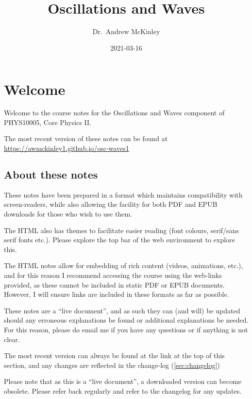 \documentclass[
]{book}
\title{Oscillations and Waves}
\author{Dr.~Andrew McKinley}
\date{2021-03-16}
\begin{document}
\maketitle

{
\setcounter{tocdepth}{1}
\tableofcontents
}
\hypertarget{welcome}{%
\chapter*{Welcome}\label{welcome}}

Welcome to the course notes for the Oscillations and Waves component of PHYS10005, Core Physics II.

The most recent version of these notes can be found at \url{https://awmckinley1.github.io/osc-waves1}

\hypertarget{about-these-notes}{%
\section*{About these notes}\label{about-these-notes}}

These notes have been prepared in a format which maintains compatibility with screen-readers, while also allowing the facility for both PDF and EPUB downloads for those who wish to use them.

The HTML also has themes to facilitate easier reading (font colours, serif/sans serif fonts etc.). Please explore the top bar of the web environment to explore this.

The HTML notes allow for embedding of rich content (videos, animations, etc.), and for this reason I recommend accessing the course using the web-links provided, as these cannot be included in static PDF or EPUB documents. However, I will ensure links are included in these formats as far as possible.

These notes are a ``live document'', and as such they can (and will) be updated should any erroneous explanations be found or additional explanations be needed. For this reason, please do email me if you have any questions or if anything is not clear.

The most recent version can always be found at the link at the top of this section, and any changes are reflected in the change-log (\ref{sec:changelog})

Please note that as this is a ``live document'', a downloaded version can become obsolete. Please refer back regularly and refer to the changelog for any updates.
\end{document}
